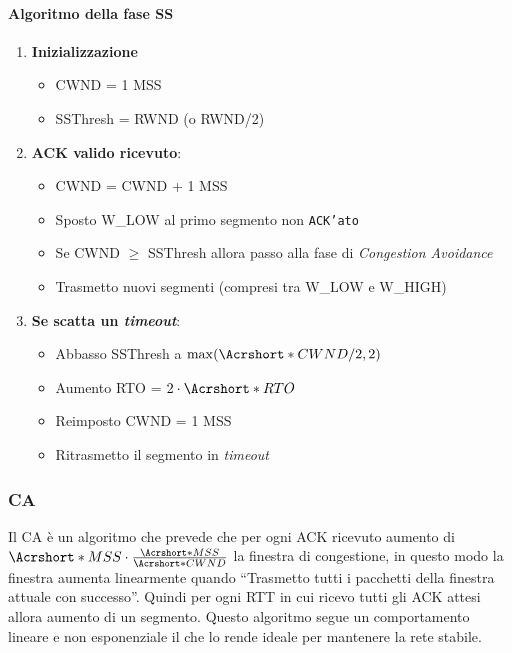             \paragraph{Algoritmo della fase \Acrlong*{SS}}
            \begin{enumerate}
                \item \textbf{Inizializzazione} \begin{itemize}
                    \item \Acrshort*{CWND} = 1 \Acrshort*{MSS}
                    \item \Acrshort*{SSThresh} = \Acrshort*{RWND} (o \Acrshort*{RWND}/2)
                \end{itemize}
                \item \textbf{\Acrshort*{ACK} valido ricevuto}:\begin{itemize}
                    \item \Acrshort*{CWND} = \Acrshort*{CWND} + 1 \Acrshort*{MSS}
                    \item Sposto \Acrshort*{W_LOW} al primo segmento non \texttt{ACK'ato}
                    \item Se \Acrshort*{CWND} $ \geq $ \Acrshort*{SSThresh} allora passo alla fase di \textit{Congestion Avoidance}
                    \item Trasmetto nuovi segmenti (compresi tra \Acrshort*{W_LOW} e \Acrshort*{W_HIGH})
                \end{itemize}
                \item \textbf{Se scatta un \textit{timeout}}: \begin{itemize}
                    \item Abbasso \Acrshort*{SSThresh} a $\max(\Acrshort*{CWND}/2, 2)$
                    \item Aumento \Acrshort*{RTO} = $2\cdot \Acrshort*{RTO}$
                    \item Reimposto \Acrshort*{CWND} = 1 \Acrshort*{MSS}
                    \item Ritrasmetto il segmento in \textit{timeout} 
                \end{itemize}
            \end{enumerate}
            \subsubsection{\Acrlong*{CA}}
            Il \Acrlong*{CA} è un algoritmo che prevede che per ogni \Acrshort*{ACK} ricevuto aumento di $ \Acrshort*{MSS}\cdot \frac{\Acrshort*{MSS}}{\Acrshort*{CWND}} $ la finestra di congestione, in questo modo la finestra aumenta linearmente quando ``Trasmetto tutti i pacchetti della finestra attuale con successo''.
            Quindi per ogni \Acrshort*{RTT} in cui ricevo tutti gli \Acrshort*{ACK} attesi allora aumento di un segmento. Questo algoritmo segue un comportamento lineare e non esponenziale il che lo rende ideale per mantenere la rete stabile.
